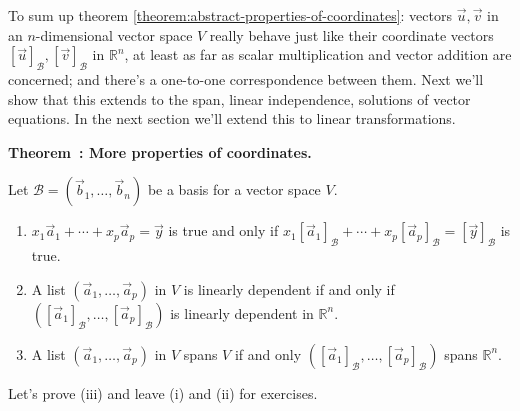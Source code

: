 \documentclass[11pt, letterpaper]{report}
\newenvironment{notes}{}{}
\newcounter{exercise}[section]
\newcounter{theorem}[chapter]
\newenvironment{theorem}[1][]{\refstepcounter{theorem}\begin{bbox}\par
    \noindent\textbf{Theorem~\thetheorem: #1}}{\end{bbox}}
\newlength\oldfboxsep%
\newlength\myminiwidth%
\newenvironment{bbox}{%
  \setlength\oldfboxsep\fboxsep
  \setlength{\fboxsep}{.1in}%
  \setlength\myminiwidth\linewidth%
  \addtolength\myminiwidth{-0.2in}%
  \vspace{0.1in}%
  \begin{lrbox}{\bboxbox}\begin{minipage}{\myminiwidth}%
    }{%
    \end{minipage}\end{lrbox}%
  \noindent\fbox{\usebox{\bboxbox}}\vspace{0.1in}\setlength\fboxsep\oldfboxsep%
}
\newcommand{\R}{\mathbb{R}}
\begin{document}
To sum up theorem \ref{theorem:abstract-properties-of-coordinates}: vectors $\vec{u},\vec{v}$ in an $n$-dimensional vector space $V$ really behave just like their coordinate vectors $[\vec{u}]_{\mathcal{B}}, [\vec{v}]_{\mathcal{B}}$ in $\R^n$, at least as far as scalar multiplication and vector addition are concerned; and there's a one-to-one correspondence between them. Next we'll show that this extends to the span, linear independence, solutions of vector equations. In the next section we'll extend this to linear transformations.


\begin{notes}
\newpage
\end{notes}

\begin{theorem}[More properties of coordinates.] 
\label{theorem:abstract-more-properties-of-coordinates} 

Let $\mathcal{B} = ( \vec{b}_1, \ldots, \vec{b}_n)$ be a basis for a vector space $V$.
\begin{enumerate}[label=(\roman*)]
\item $x_1 \vec{a}_1 + \cdots + x_p \vec{a}_p = \vec{y}$ is true and only if $x_1 [\vec{a}_1]_{\mathcal B} + \cdots + x_p [\vec{a}_p]_{\mathcal B} = [\vec{y}]_{\mathcal B}$ is true.
\item A list $( \vec{a}_1, \ldots, \vec{a}_p )$ in $V$ is linearly dependent if and only if $( [\vec{a}_1]_{\mathcal{B}}, \ldots, [\vec{a}_p]_{\mathcal{B}} )$ is linearly dependent in $\R^{n}$.
\item A list $( \vec{a}_1, \ldots, \vec{a}_p )$ in $V$ spans $V$ if and only $( [\vec{a}_1]_{\mathcal{B}}, \ldots, [\vec{a}_p]_{\mathcal{B}} )$ spans $\R^{n}$.
\end{enumerate}
\end{theorem}

Let's prove (iii) and leave (i) and (ii) for exercises.

\begin{notes}
\vfill
\end{notes}
\end{document}
